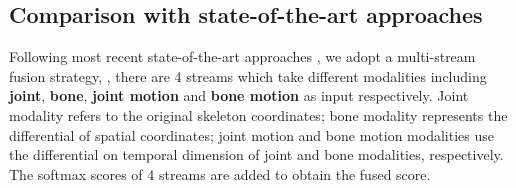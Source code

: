 \documentclass[10pt,twocolumn,letterpaper]{article}
\begin{document}
\begin{table}[h]
  \centering
    \caption{Action classiﬁcation performance on the Northwestern-UCLA dataset.}
  \label{tab:ucla}
\end{table}
\subsection{Comparison with state-of-the-art approaches}
Following most recent state-of-the-art approaches \cite{cheng2020skeleton, ye2020dynamic, chen2021channel, chen2021multi}, we adopt a multi-stream fusion strategy, \ie,
there are 4 streams which take different modalities including \textbf{joint}, \textbf{bone}, \textbf{joint motion} and \textbf{bone motion} as input respectively. Joint modality refers to the original skeleton coordinates; bone modality represents the differential of spatial coordinates; joint motion and bone motion modalities use the differential on
temporal dimension of joint and bone modalities, respectively. The softmax scores
of 4 streams are added to obtain the fused score. 
\end{document}
